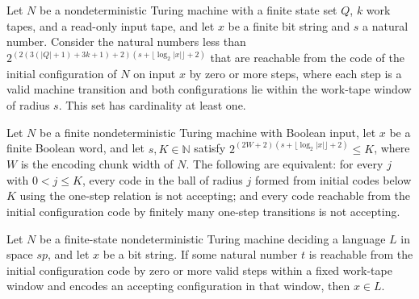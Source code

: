 \begin{theorem}
\label{Complexity.LogProg.ISGen.one_le_card_rset}
\leanok
{}
Let $N$ be a nondeterministic Turing machine with a finite state set $Q$, $k$ work
tapes, and a read-only input tape, and let $x$ be a finite bit string and $s$ a natural
number. Consider the natural numbers less than $2^{(2(3(|Q|+1)+3k+1)+2)(s+\lfloor\log_2
|x|\rfloor+2)}$ that are reachable from the code of the initial configuration of $N$ on
input $x$ by zero or more steps, where each step is a valid machine transition and both
configurations lie within the work-tape window of radius $s$. This set has cardinality
at least one.
\end{theorem}

\begin{theorem}
\label{Complexity.LogProg.ISGen.noAcc_balls_iff}
\leanok
{}
Let $N$ be a finite nondeterministic Turing machine with Boolean input, let $x$ be a
finite Boolean word, and let $s,K\in\mathbb{N}$ satisfy $2^{(2W+2)(s+\lfloor\log_2
|x|\rfloor+2)}\le K$, where $W$ is the encoding chunk width of $N$. The following are
equivalent: for every $j$ with $0<j\le K$, every code in the ball of radius $j$ formed
from initial codes below $K$ using the one-step relation is not accepting; and every
code reachable from the initial configuration code by finitely many one-step transitions
is not accepting.
\end{theorem}

\begin{theorem}
\label{Complexity.LogProg.ISGen.mem_of_exists_acc}
\leanok
{}
Let $N$ be a finite-state nondeterministic Turing machine deciding a language $L$ in
space $sp$, and let $x$ be a bit string. If some natural number $t$ is reachable from
the initial configuration code by zero or more valid steps within a fixed work-tape
window and encodes an accepting configuration in that window, then $x\in L$.
\end{theorem}

